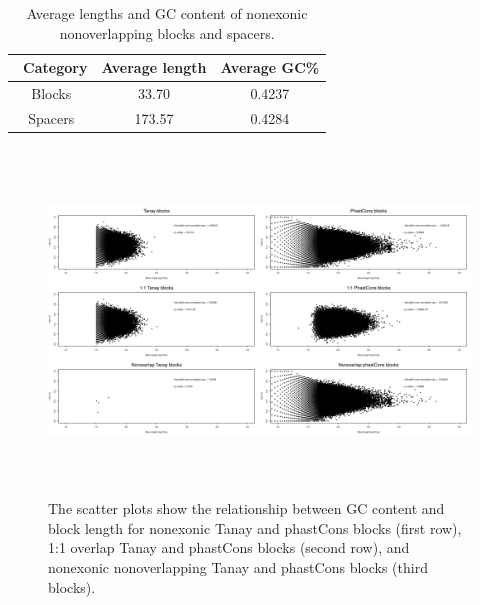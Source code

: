 \documentclass[12pt]{report}
\begin{document}
\begin{table}[ht]
\centering
\begin{tabular}{c c c}
\hline\hline
\ Category & Average length & Average GC\% \\ [0.5ex]
\hline
Blocks & 33.70 & 0.4237 \\
Spacers & 173.57 & 0.4284 \\ [1ex] 
\hline
\end{tabular}
\caption[Caption for LOF]{\centering Average lengths and GC content of nonexonic nonoverlapping blocks and spacers.}
\end{table}

\begin{figure}[htbp]
\centering
\includegraphics[width=\textwidth, height=92mm]{scatters_GC_length.jpg}
\caption{The scatter plots show the relationship between GC content and block length for nonexonic Tanay and phastCons blocks (first row), 1:1 overlap Tanay and phastCons blocks (second row), and nonexonic nonoverlapping Tanay and phastCons blocks (third blocks).}
\label{fig:scatter_all}
\end{figure}
\end{document}
